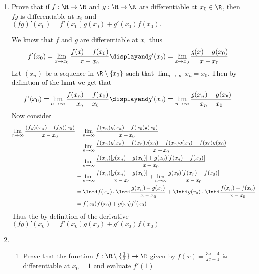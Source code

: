 \documentclass[11pt]{exam}
\begin{document}
    \begin{enumerate}
        \item Prove that if $f: \R \to \R$ and $g: \R \to \R$ are differentiable at $x_0 \in \R$, then 
        $fg$ is differentiable at $x_0$ and $(fg)'(x_0) = f'(x_0)g(x_0) + g'(x_0)f(x_0).$
            \begin{solution}
                We know that $f$ and $g$ are differentiable at $x_0$ thus 
                $$f'(x_0)  = \lim_{x \to x_0} \frac{f(x) - f(x_0)}{x - x_0} 
                \displayand g'(x_0)  = \lim_{x \to x_0} \frac{g(x) - g(x_0)}{x - x_0}$$
                Let $(x_n)$ be a sequence in $\R \setminus \{x_0\}$ such that $\lim_{n \to \infty} x_n = x_0$. Then by definition of the limit 
                we get that 
                $$f'(x_0) = \lim_{n \to \infty} \frac{f(x_n) - f(x_0)}{x_n - x_0} \displayand g'(x_0) = \lim_{n \to \infty} \frac{g(x_n) - g(x_0)}{x_n - x_0} $$
                Now consider 
                \begin{align*}
                    \lim_{n \to \infty} \frac{(fg)(x_n) - (fg)(x_0)}{x - x_0} 
                    &= \lim_{n \to \infty} \frac{f(x_n)g(x_n) - f(x_0)g(x_0)}{x-x_0}  \\
                    &= \lim_{n \to \infty} \frac{f(x_n)g(x_n) - f(x_n)g(x_0) + f(x_n)g(x_0) -f(x_0)g(x_0)}{x-x_0} \\
                    &= \lim_{n \to \infty} \frac{f(x_n)[g(x_n) - g(x_0)] + g(x_0)[f(x_n) - f(x_0)]}{x-x_0} \\
                    &=  \lim_{n \to \infty} \frac{f(x_n)[g(x_n) - g(x_0)]}{x-x_0} + \lim_{n \to \infty} \frac{g(x_0)[f(x_n) - f(x_0)]}{x-x_0} \\
                    &= \lnti f(x_n) \cdot \lnti \frac{g(x_n) - g(x_0)}{x-x_0} + \lnti g(x_0) \cdot \lnti \frac{f(x_n) - f(x_0)}{x-x_0} \\
                    &= f(x_0)g'(x_0) + g(x_0)f'(x_0)
                \end{align*}
                Thus the by definition of the derivative $(fg)'(x_0) = f'(x_0)g(x_0) + g'
                (x_0)f(x_0)$
            \end{solution}
            \break
        \item 
            \begin{enumerate}
                \item Prove that the function $f: \R \setminus \{\frac{1}{2}\} \to \R$ given by $f(x) = \frac{3x+4}{2x-1}$ is differentiable at 
                $x_0 = 1$ and evaluate $f'(1)$

\end{enumerate}
\end{enumerate}
\end{document}

